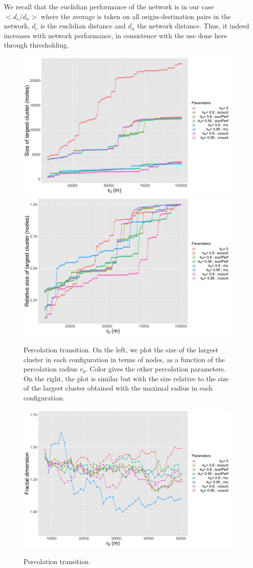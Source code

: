 \documentclass{jimis-en}
\begin{document}
We recall that the euclidian performance of the network \citep{banos2012towards} is in our case $<d_e/d_n>$ where the average is taken on all origin-destination pairs in the network, $d_e$ is the euclidian distance and $d_n$ the network distance. Thus, it indeed increases with network performance, in consistence with the use done here through thresholding.




\begin{figure}[ht] 
  {\includegraphics[width=0.49\linewidth]{figures/abssize_nodes.png}}
  {\includegraphics[width=0.49\linewidth]{figures/relsize_nodes.png}}
  \centering
  \caption{Percolation transition. On the left, we plot the size of the largest cluster in each configuration in terms of nodes, as a function of the percolation radius $r_0$. Color gives the other percolation parameters. On the right, the plot is similar but with the size relative to the size of the largest cluster obtained with the maximal radius in each configuration.\label{fig:percolation}}
\end{figure}

\begin{figure}[ht] 
  {\includegraphics[width=\linewidth]{figures/fractaldimension.png}}
  \centering
  \caption{Percolation transition.\label{fig:fractaldim}}
\end{figure}
\end{document}
